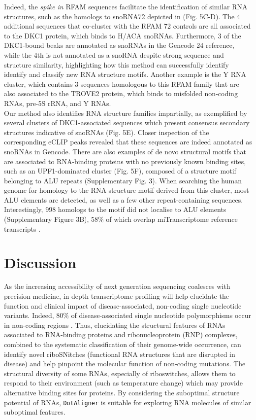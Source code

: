 \documentclass{bmcart}
\newcommand\dotaligner{\texttt{DotAligner}}
\begin{document}
Indeed, the \textit{spike in} RFAM sequences facilitate the identification of similar RNA structures, 
such as the homologs to snoRNA72 depicted in (Fig. 5C-D). The 4 additional sequences that 
co-cluster with the RFAM 72 controls are all associated to the DKC1 protein, which binds to H/ACA snoRNAs. 
Furthermore, 3 of the DKC1-bound beaks are annotated as snoRNAs in the Gencode 24 reference, 
while the 4th is not annotated as a snoRNA despite strong sequence and structure similarity, 
highlighting how this method can successfully identify identify and classify new RNA structure motifs. 
Another example is the Y RNA cluster, which contains 3 sequences homologous to this RFAM family 
that are also associated to the TROVE2 protein, which binds to misfolded non-coding RNAs, 
pre-5S rRNA, and Y RNAs.\\

Our method also identifies RNA structure families impartially, 
as exemplified by several clusters of DKC1-associated sequences which present
consensus secondary structures indicative of snoRNAs (Fig. 5E). 
Closer inspection of the corresponding eCLIP peaks revealed that these sequences
are indeed annotated as snoRNAs in Gencode. There are also examples of de novo 
structural motifs that are associated to RNA-binding proteins with no 
previously known binding sites, such as an UPF1-dominated cluster 
(Fig. 5F), composed of a structure motif belonging to ALU repeats 
(Supplementary Fig. 3). When searching the human genome for 
homology to the RNA structure motif derived from this cluster, 
most ALU elements are detected, as well as a few other repeat-containing sequences. 
Interestingly, 998 homologs to the motif did not localise to ALU elements (Supplementary Figure 3B), 
58\% of which overlap miTranscriptome reference transcripts \cite{iyer2015landscape}. 


\section*{Discussion}

As the increasing accessibility of next generation sequencing coalesces with
precision medicine, in-depth transcriptome profiling will help elucidate the
function and clinical impact of disease-associated, non-coding single
nucleotide variants. Indeed, 80\% of disease-associated single nucleotide
polymorphisms occur in non-coding regions
\cite{hindorff2009potential,ritchie2014functional}. Thus, elucidating the
structural features of RNAs associated to RNA-binding proteins and
ribonucleoprotein (RNP) complexes, combined to the systematic classification of
their genome-wide occurrence, can identify novel riboSNitches (functional RNA
structures that are disrupted in disease) and help pinpoint the molecular
function of non-coding mutations. The structural diversity of some RNAs,
especially of riboswitches, allows them to respond to their environment (such
as temperature change) which may provide alternative binding sites for
proteins. By considering the suboptimal structure potential of RNAs, \dotaligner{}
is suitable for exploring RNA molecules of similar suboptimal features. \\
\end{document}
